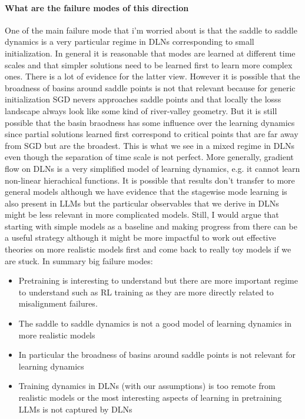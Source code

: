 \documentclass{article}
\theoremstyle{definition}
\begin{document}
\paragraph{What are the failure modes of this direction}
One of the main failure mode that i'm worried about is that the saddle to saddle dynamics is a very particular regime in DLNs corresponding to small initialization. In general it is reasonable that modes are learned at different time scales and that simpler solutions need to be learned first to learn more complex ones. There is a lot of evidence for the latter view. However it is possible that the broadness of basins around saddle points is not that relevant because for generic initialization SGD nevers approaches saddle points and that locally the losss landscape always look like some kind of river-valley geometry. But it is still possible that the basin braodness has some influence over the learning dynamics since partial solutions learned first correspond to critical points that are far away from SGD but are the broadest. This is what we see in a mixed regime in DLNs even though the separation of time scale is not perfect. More generally, gradient flow on DLNs is a very simplified model of learning dynamics, e.g. it cannot learn non-linear hierachical functions. It is possible that results don't transfer to more general models although we have evidence that the stagewise mode learning is also present in LLMs but the particular observables that we derive in DLNs might be less relevant in more complicated models. Still, I would argue that starting with simple models as a baseline and making progress from there can be a useful strategy although it might be more impactful to work out effective theories on more realistic models first and come back to really toy models if we are stuck. In summary big failure modes:
\begin{itemize}
    \item Pretraining is interesting to understand but there are more important regime to understand such as RL training as they are more directly related to misalignment failures. 
    \item The saddle to saddle dynamics is not a good model of learning dynamics in more realistic models
    \item In particular the broadness of basins around saddle points is not relevant for learning dynamics
    \item Training dynamics in DLNs (with our assumptions) is too remote from realistic models or the most interesting aspects of learning in pretraining LLMs is not captured by DLNs
\end{itemize} 
\end{document}
